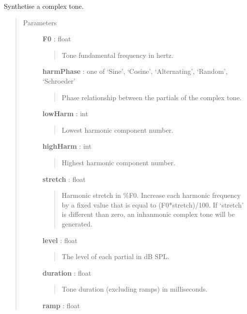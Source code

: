 \documentclass[a4paper,12pt,english]{sphinxmanual}
\begin{document}
\begin{fulllineitems}
\label{sndlib:sndlib.complexTone}
Synthetise a complex tone.
\begin{quote}\begin{description}
\item[{Parameters }] \leavevmode
\textbf{F0} : float
\begin{quote}

Tone fundamental frequency in hertz.
\end{quote}

\textbf{harmPhase} : one of `Sine', `Cosine', `Alternating', `Random', `Schroeder'
\begin{quote}

Phase relationship between the partials of the complex tone.
\end{quote}

\textbf{lowHarm} : int
\begin{quote}

Lowest harmonic component number.
\end{quote}

\textbf{highHarm} : int
\begin{quote}

Highest harmonic component number.
\end{quote}

\textbf{stretch} : float
\begin{quote}

Harmonic stretch in \%F0. Increase each harmonic frequency by a fixed value
that is equal to (F0*stretch)/100. If `stretch' is different than
zero, an inhanmonic complex tone will be generated.
\end{quote}

\textbf{level} : float
\begin{quote}

The level of each partial in dB SPL.
\end{quote}

\textbf{duration} : float
\begin{quote}

Tone duration (excluding ramps) in milliseconds.
\end{quote}

\textbf{ramp} : float
\begin{quote}


\end{quote}
\end{description}
\end{quote}
\end{fulllineitems}
\end{document}
